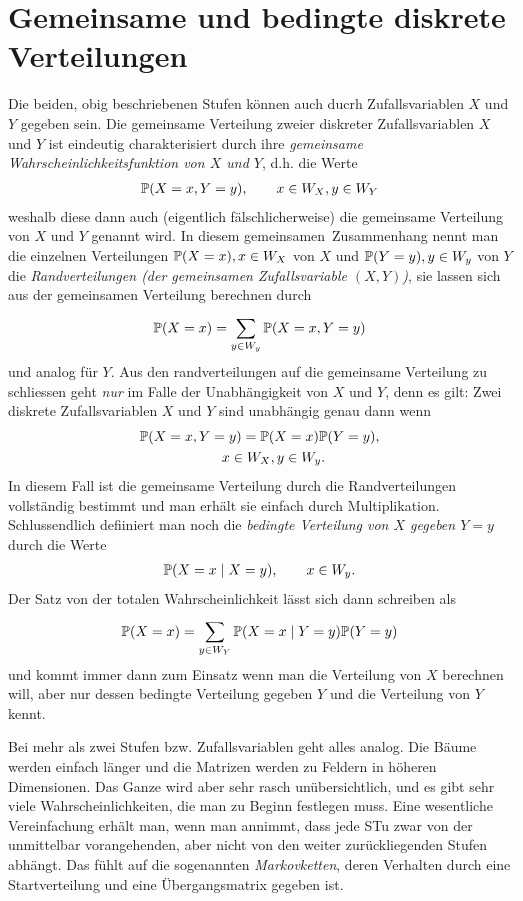 \section{Gemeinsame und bedingte diskrete Verteilungen}
Die beiden, obig beschriebenen Stufen können auch ducrh Zufallsvariablen $X$ und $Y$ gegeben sein. Die gemeinsame Verteilung zweier diskreter Zufallsvariablen $X$ und $Y$ ist eindeutig charakterisiert durch ihre \emph{gemeinsame Wahrscheinlichkeitsfunktion von $X$ und $Y$}, d.h. die Werte
\begin{gather*}
	\mathbb P(X=x,Y=y), \qquad x\in W_{X}, y\in W_{Y}
\end{gather*}
	weshalb diese dann auch (eigentlich fälschlicherweise) die gemeinsame Verteilung von $X$ und $Y$ genannt wird. In diesem \glqq gemeinsamen\grqq\ Zusammenhang nennt man die einzelnen Verteilungen $\mathbb P(X=x), x\in W_X$ von $X$ und $\mathbb P(Y=y), y\in W_y$ von $Y$ die \emph{Randverteilungen (der gemeinsamen Zufallsvariable $(X,Y)$)}, sie lassen sich aus der gemeinsamen Verteilung berechnen durch
\begin{gather*}
	\mathbb P(X=x)=\sum_{y\in W_y}^{}\mathbb P(X=x,Y=y)
\end{gather*}
und analog für $Y$. Aus den randverteilungen auf die gemeinsame Verteilung zu schliessen geht \emph{nur} im Falle der Unabhängigkeit von $X$ und $Y$, denn es gilt: Zwei diskrete Zufallsvariablen $X$ und $Y$ sind unabhängig genau dann wenn
\begin{gather*}
	\mathbb P(X=x,Y=y)=\mathbb P(X=x)\mathbb P(Y=y),\\\qquad x\in W_X,y\in W_y.
\end{gather*}
In diesem Fall ist die gemeinsame Verteilung durch die Randverteilungen vollständig bestimmt und man erhält sie einfach durch Multiplikation. Schlussendlich defiiniert man noch die \emph{bedingte Verteilung von $X$ gegeben $Y=y$} durch die Werte
\begin{gather*}
	\mathbb P(X=x\mid X=y),\qquad x\in W_{y}.
\end{gather*}
Der Satz von der totalen Wahrscheinlichkeit lässt sich dann schreiben als
\begin{gather*}
	\mathbb P(X=x)=\sum_{y\in W_{Y}}^{}\mathbb P(X=x\mid Y=y)\mathbb P(Y=y)
\end{gather*}
und kommt immer dann zum Einsatz wenn man die Verteilung von $X$ berechnen will, aber nur dessen bedingte Verteilung gegeben $Y$ und die Verteilung von $Y$ kennt.

Bei mehr als zwei Stufen bzw. Zufallsvariablen geht alles analog. Die Bäume werden einfach länger und die Matrizen werden zu Feldern in höheren Dimensionen. Das Ganze wird aber sehr rasch unübersichtlich, und es gibt sehr viele Wahrscheinlichkeiten, die man zu Beginn festlegen muss. Eine wesentliche Vereinfachung erhält man, wenn man annimmt, dass jede STu zwar von der unmittelbar vorangehenden, aber nicht von den weiter zurückliegenden Stufen abhängt. Das fühlt auf die sogenannten \emph{Markovketten}, deren Verhalten durch eine Startverteilung und eine Übergangsmatrix gegeben ist.
